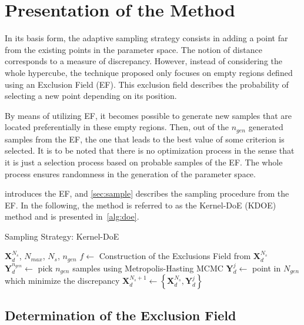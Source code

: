 \section{Presentation of the Method}\label{sec:method}

In its basis form, the adaptive sampling strategy consists in adding a point far from the existing points in the parameter space. The notion of distance corresponds to a measure of discrepancy. However, instead of considering the whole hypercube, the technique proposed only focuses on empty regions defined using an Exclusion Field (EF). This exclusion field describes the probability of selecting a new point depending on its position.

By means of utilizing EF, it becomes possible to generate new samples that are located preferentially in these empty regions. Then, out of the $n_{gen}$ generated samples from the EF, the one that leads to the best value of some criterion is selected. It is to be noted that there is no optimization process in the sense that it is just a selection process based on probable samples of the EF. The whole process ensures randomness in the generation of the parameter space.

 introduces the EF, and \cref{sec:sample} describes the sampling procedure from the EF. In the following, the method is referred to as the Kernel-DoE (KDOE) method and is presented in~\cref{alg:doe}.

\begin{algorithm}
  \caption{Sampling Strategy: Kernel-DoE}
  \label{alg:doe}
  \begin{algorithmic}[1]
  \Require $\mathbf{X}^{N_s}_d$, $N_{max}$, $N_s$, $n_{gen}$
    \State $f \gets$ Construction of the Exclusions Field from $\mathbf{X}^{N_s}_d$
    \State $\mathbf{Y}^{n_{gen}}_d \gets$ pick $n_{gen}$ samples using Metropolis-Hasting MCMC
    \State $\mathbf{Y}^{j}_d \gets$ point in $N_{gen}$ which minimize the discrepancy
    \State $\mathbf{X}^{N_s + 1}_d \gets \left\{\mathbf{X}^{N_s}_d, \mathbf{Y}^{j}_d \right\}$
  \EndWhile
  \end{algorithmic}
\end{algorithm}




\subsection{Determination of the Exclusion Field}\label{sec:kde}

